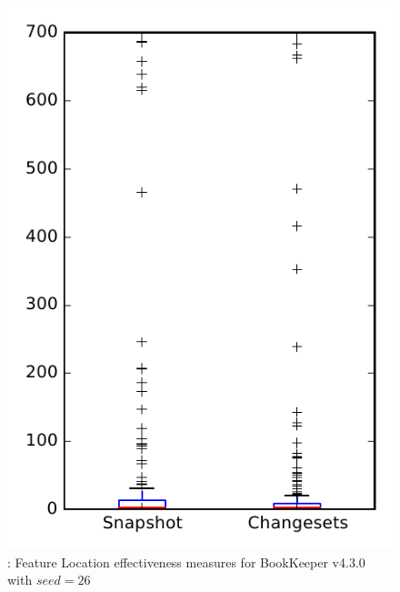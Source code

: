 
\begin{figure}
\centering
\includegraphics[height=0.4\textheight]{figures/flt_seed/rq1_bookkeeper_26}
\caption{\rone: Feature Location effectiveness measures for BookKeeper v4.3.0 with $seed=26$}
\label{fig:flt_seed:rq1:bookkeeper}
\end{figure}
